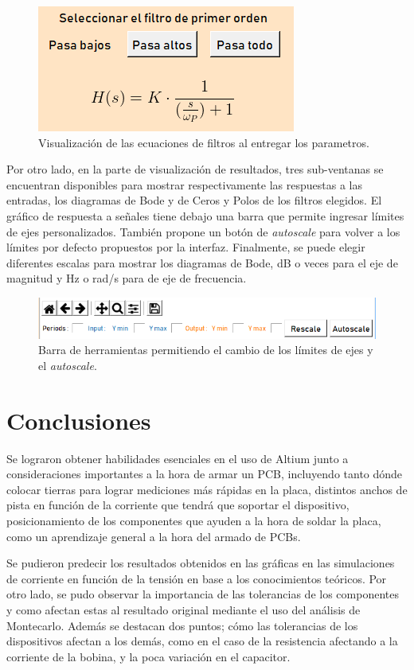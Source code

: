 \documentclass[a4paper]{article}
\begin{document}
\begin{figure}[h]
\begin{center}
\includegraphics[scale=0.6]{EcuacionUI}
\caption{Visualización de las ecuaciones de filtros al entregar los parametros.}
\end{center}
\end{figure}

Por otro lado, en la parte de visualización de resultados, tres sub-ventanas se encuentran disponibles para mostrar respectivamente las respuestas a las entradas, los diagramas de Bode y de Ceros y Polos de los filtros elegidos.
El gráfico de respuesta a señales tiene debajo una barra que permite ingresar límites de ejes personalizados. También propone un botón de \textit{autoscale} para volver a los límites por defecto propuestos por la interfaz. Finalmente, se puede elegir diferentes escalas para mostrar los diagramas de Bode, dB o veces para el eje de magnitud y Hz o rad/s para de eje de frecuencia.

\begin{figure}[h]
\begin{center}
\includegraphics[scale=0.7]{RescaleUI}
\caption{Barra de herramientas permitiendo el cambio de los límites de ejes y el \textit{autoscale}.}
\end{center}
\end{figure}


\section*{Conclusiones}

Se lograron obtener habilidades esenciales en el uso de Altium junto a consideraciones importantes a la hora de armar un PCB, incluyendo tanto dónde colocar tierras para lograr mediciones más rápidas en la placa, distintos anchos de pista en función de la corriente que tendrá que soportar el dispositivo, posicionamiento de los componentes que ayuden a la hora de soldar la placa, como un aprendizaje general a la hora del armado de PCBs.

Se pudieron predecir los resultados obtenidos en las gráficas en las simulaciones de corriente en función de la tensión en base a los conocimientos teóricos. Por otro lado, se pudo observar la importancia de las tolerancias de los componentes y como afectan estas al resultado original mediante el uso del análisis de Montecarlo. Además se destacan dos puntos; cómo las tolerancias de los dispositivos afectan a los demás, como en el caso de la resistencia afectando a la corriente de la bobina, y la poca variación en el capacitor. 
\end{document}
